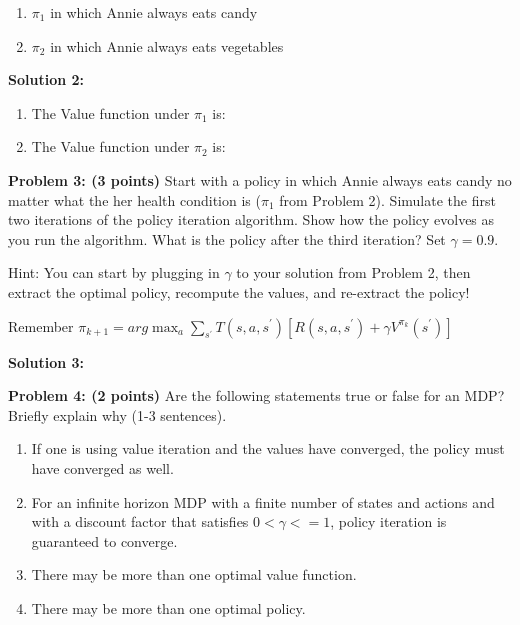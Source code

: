 \documentclass[]{article}
\begin{document}
\begin{enumerate}[label=(\alph*)]
    \item $\pi_1$ in which Annie always eats candy
    \item $\pi_2$ in which Annie always eats vegetables
\end{enumerate}

\bigskip

\textbf{Solution 2:}
\begin{enumerate}[label=(\alph*)]
    \item The Value function under $\pi_1$ is:
    \item The Value function under $\pi_2$ is:
\end{enumerate}

\clearpage
\textbf{Problem 3: (3 points)}
Start with a policy in which Annie always eats candy no matter what the her health condition is ($\pi_1$ from Problem 2). Simulate the first two iterations of the policy iteration algorithm. Show how the policy evolves as you run the algorithm. What is the policy after the third iteration? Set $\gamma = 0.9$. 

Hint: You can start by plugging in $\gamma$ to your solution from Problem 2, then extract the optimal policy, recompute the values, and re-extract the policy!

Remember $\pi_{k+1} = arg\max_a \sum_{s^\prime} T(s,a,s^{\prime})\left[R(s,a,s^\prime) + \gamma V^{\pi_k}(s^\prime)\right]$\\

\bigskip

\textbf{Solution 3:}

\clearpage
\textbf{Problem 4: (2 points)}
Are the following statements true or false for an MDP? Briefly explain why (1-3 sentences).
\begin{enumerate}[label=(\alph*)]
    \item If one is using value iteration and the values have converged, the policy must have converged as well.
    \item For an infinite horizon MDP with a finite number of states and actions and with a discount factor that satisfies $0 < \gamma <= 1$, policy iteration is guaranteed to converge.
    \item There may be more than one optimal value function.
    \item There may be more than one optimal policy.
\end{enumerate}
\end{document}
